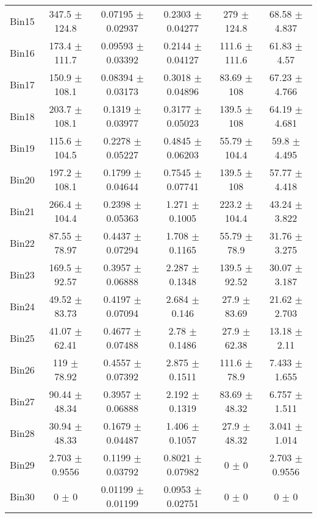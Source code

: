 \begin{tabular}{@{\extracolsep{4pt}}lccccc@{}}
     Bin15 & 347.5 $\pm$ 124.8 & 0.07195 $\pm$ 0.02937 & 0.2303 $\pm$ 0.04277 & 279 $\pm$ 124.8 & 68.58 $\pm$ 4.837 \\ 
     Bin16 & 173.4 $\pm$ 111.7 & 0.09593 $\pm$ 0.03392 & 0.2144 $\pm$ 0.04127 & 111.6 $\pm$ 111.6 & 61.83 $\pm$ 4.57 \\ 
     Bin17 & 150.9 $\pm$ 108.1 & 0.08394 $\pm$ 0.03173 & 0.3018 $\pm$ 0.04896 & 83.69 $\pm$ 108 & 67.23 $\pm$ 4.766 \\ 
     Bin18 & 203.7 $\pm$ 108.1 & 0.1319 $\pm$ 0.03977 & 0.3177 $\pm$ 0.05023 & 139.5 $\pm$ 108 & 64.19 $\pm$ 4.681 \\ 
     Bin19 & 115.6 $\pm$ 104.5 & 0.2278 $\pm$ 0.05227 & 0.4845 $\pm$ 0.06203 & 55.79 $\pm$ 104.4 & 59.8 $\pm$ 4.495 \\ 
     Bin20 & 197.2 $\pm$ 108.1 & 0.1799 $\pm$ 0.04644 & 0.7545 $\pm$ 0.07741 & 139.5 $\pm$ 108 & 57.77 $\pm$ 4.418 \\ 
     Bin21 & 266.4 $\pm$ 104.4 & 0.2398 $\pm$ 0.05363 & 1.271 $\pm$ 0.1005 & 223.2 $\pm$ 104.4 & 43.24 $\pm$ 3.822 \\ 
     Bin22 & 87.55 $\pm$ 78.97 & 0.4437 $\pm$ 0.07294 & 1.708 $\pm$ 0.1165 & 55.79 $\pm$ 78.9 & 31.76 $\pm$ 3.275 \\ 
     Bin23 & 169.5 $\pm$ 92.57 & 0.3957 $\pm$ 0.06888 & 2.287 $\pm$ 0.1348 & 139.5 $\pm$ 92.52 & 30.07 $\pm$ 3.187 \\ 
     Bin24 & 49.52 $\pm$ 83.73 & 0.4197 $\pm$ 0.07094 & 2.684 $\pm$ 0.146 & 27.9 $\pm$ 83.69 & 21.62 $\pm$ 2.703 \\ 
     Bin25 & 41.07 $\pm$ 62.41 & 0.4677 $\pm$ 0.07488 & 2.78 $\pm$ 0.1486 & 27.9 $\pm$ 62.38 & 13.18 $\pm$ 2.11 \\ 
     Bin26 & 119 $\pm$ 78.92 & 0.4557 $\pm$ 0.07392 & 2.875 $\pm$ 0.1511 & 111.6 $\pm$ 78.9 & 7.433 $\pm$ 1.655 \\ 
     Bin27 & 90.44 $\pm$ 48.34 & 0.3957 $\pm$ 0.06888 & 2.192 $\pm$ 0.1319 & 83.69 $\pm$ 48.32 & 6.757 $\pm$ 1.511 \\ 
     Bin28 & 30.94 $\pm$ 48.33 & 0.1679 $\pm$ 0.04487 & 1.406 $\pm$ 0.1057 & 27.9 $\pm$ 48.32 & 3.041 $\pm$ 1.014 \\ 
     Bin29 & 2.703 $\pm$ 0.9556 & 0.1199 $\pm$ 0.03792 & 0.8021 $\pm$ 0.07982 & 0 $\pm$ 0 & 2.703 $\pm$ 0.9556 \\ 
     Bin30 & 0 $\pm$ 0 & 0.01199 $\pm$ 0.01199 & 0.0953 $\pm$ 0.02751 & 0 $\pm$ 0 & 0 $\pm$ 0 \\ 
\hline\hline
  \end{tabular}
